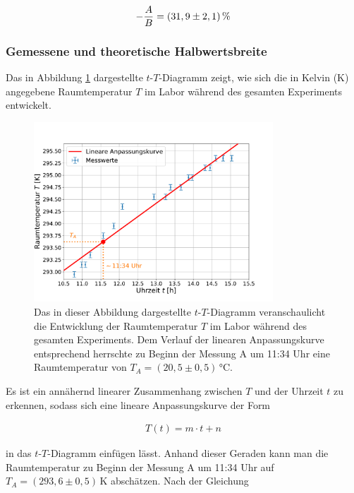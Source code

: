 \documentclass[
a4paper,                %
titlepage=firstiscover, %
captions=tableheading,  %
toc=bibliography,       %
toc=listof,             %
oneside,                %
automark,               %
12pt,                   %
english, ngerman,       %
parskip = half,         %
]{scrartcl}
\begin{document}
\begin{align*}
-\frac{A}{B}=(31,9\pm 2,1)\,\textnormal{\%}
\end{align*}


\subsubsection{Gemessene und theoretische Halbwertsbreite}

Das in Abbildung \ref{RaumtemperaturLabor} dargestellte $t$-$T$-Diagramm zeigt, wie sich die in Kelvin (K) angegebene Raumtemperatur $T$ im Labor während des gesamten Experiments entwickelt.

\begin{figure}[H]
	\centering
	\includegraphics[width=0.8\textwidth]{raw/RaumtemperaturLabor}
	\caption{Das in dieser Abbildung dargestellte $t$-$T$-Diagramm veranschaulicht die Entwicklung der Raumtemperatur $T$ im Labor während des gesamten Experiments. Dem Verlauf der linearen Anpassungskurve entsprechend herrschte zu Beginn der Messung A um 11:34 Uhr eine Raumtemperatur von $T_{A}=(20,5\pm 0,5)\,$°C.}
	\label{RaumtemperaturLabor}
\end{figure}

\noindent Es ist ein annähernd linearer Zusammenhang zwischen $T$ und der Uhrzeit $t$ zu erkennen, sodass sich eine lineare Anpassungskurve der Form

\begin{align}
T(t) = m\cdot t + n
\end{align}

\noindent in das $t$-$T$-Diagramm einfügen lässt.
Anhand dieser Geraden kann man die Raumtemperatur zu Beginn der Messung A um 11:34 Uhr auf $T_{A}=(293,6\pm 0,5)\,$K abschätzen.
Nach der Gleichung
\end{document}
